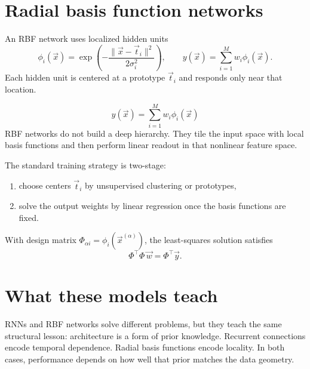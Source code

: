 \section{Radial basis function networks}

An RBF network uses localized hidden units
\[
  \phi_i(\vec{x})
  =
  \exp\!\left(
    -\frac{\lVert \vec{x}-\vec{t}_i \rVert^2}{2\sigma_i^2}
  \right),
  \qquad
  y(\vec{x}) = \sum_{i=1}^{M} w_i \phi_i(\vec{x}).
\]
Each hidden unit is centered at a prototype $\vec{t}_i$ and responds only near that location.

\begin{keyequation}
\[
y(\vec{x}) = \sum_{i=1}^{M} w_i \phi_i(\vec{x})
\]
\tcblower
RBF networks do not build a deep hierarchy. They tile the input space with local basis functions and then perform linear readout in that nonlinear feature space.
\end{keyequation}

The standard training strategy is two-stage:
\begin{enumerate}
  \item choose centers $\vec{t}_i$ by unsupervised clustering or prototypes,
  \item solve the output weights by linear regression once the basis functions are fixed.
\end{enumerate}

With design matrix $\Phi_{\alpha i} = \phi_i(\vec{x}^{(\alpha)})$, the least-squares solution satisfies
\[
  \Phi^\top \Phi \, \vec{w} = \Phi^\top \vec{y}.
\]

\section{What these models teach}

RNNs and RBF networks solve different problems, but they teach the same structural lesson: architecture is a form of prior knowledge. Recurrent connections encode temporal dependence. Radial basis functions encode locality. In both cases, performance depends on how well that prior matches the data geometry.
